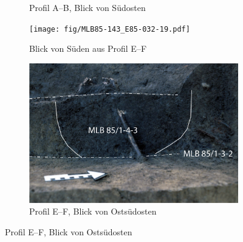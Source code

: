 \begin{figure}[p]
\centering
\begin{subfigure}[b]{\textwidth}
\caption{Profil A--B, Blick von Südosten}
 \label{fig:MLB85-143_Prof_A-B}
 \vspace{1ex}
\end{subfigure}
\begin{subfigure}[b]{\columnwidth}
\texttt{[image: fig/MLB85-143\_E85-032-19.pdf]}
\caption{Blick von Süden aus Profil E--F}
 \label{fig:MLB85-143_Prof_E-F_1}
\end{subfigure}\hfill
\begin{subfigure}[b]{\columnwidth}
\includegraphics[width = \columnwidth]{fig/MLB85-143_E85-032-16.pdf}
\caption{Profil E--F, Blick von Ostsüdosten}
 \label{fig:MLB85-143_Prof_E-F_2}
\vspace{4.25ex}

\end{subfigure}
\end{figure}
